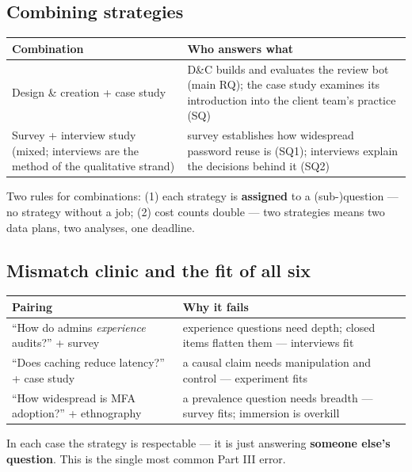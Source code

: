 \documentclass[11pt,a4paper,british,twoside=false,headings=small,chapterprefix=false,numbers=noenddot]{scrbook}
\begin{document}
\subsection{Combining strategies}
\begin{center}\small
\footnotesize
  \renewcommand{\arraystretch}{1.35}
  \begin{tabular}{@{}p{5.0cm}p{8.3cm}@{}}
    \toprule
    \textbf{Combination} & \textbf{Who answers what}\\
    \midrule
    Design \& creation + case study & D\&C builds and evaluates the review bot (main RQ); the case study examines its introduction into the client team's practice (SQ)\\
    Survey + interview study (mixed; interviews are the method of the qualitative strand) & survey establishes how widespread password reuse is (SQ1); interviews explain the decisions behind it (SQ2)\\
    \bottomrule
  \end{tabular}
  

  Two rules for combinations: (1) each strategy is \textbf{assigned} to a
  (sub-)question --- no strategy without a job; (2) cost counts double ---
  two strategies means two data plans, two analyses, one deadline.
\end{center}


\subsection{Mismatch clinic and the fit of all six}
\begin{center}\small
\small
  \renewcommand{\arraystretch}{1.4}
  \begin{tabular}{@{}p{6.4cm}p{6.4cm}@{}}
    \toprule
    \textbf{Pairing} & \textbf{Why it fails}\\
    \midrule
    ``How do admins \emph{experience} audits?'' + survey & experience questions need depth; closed items flatten them --- interviews fit\\
    ``Does caching reduce latency?'' + case study & a causal claim needs manipulation and control --- experiment fits\\
    ``How widespread is MFA adoption?'' + ethnography & a prevalence question needs breadth --- survey fits; immersion is overkill\\
    \bottomrule
  \end{tabular}
  

  In each case the strategy is respectable --- it is just answering
  \textbf{someone else's question}. This is the single most common Part III
  error.
\end{center}
\end{document}
